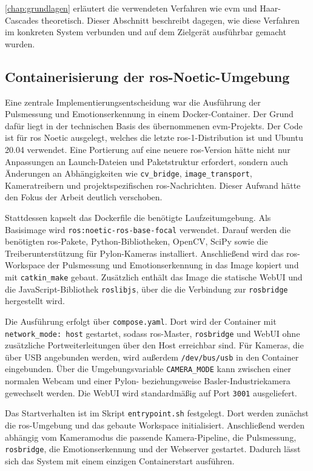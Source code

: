 \cref{chap:grundlagen} erläutert die verwendeten Verfahren wie \ac{evm} und Haar-Cascades theoretisch. Dieser Abschnitt beschreibt dagegen, wie diese Verfahren im konkreten System verbunden und auf dem Zielgerät ausführbar gemacht wurden.

\subsection{Containerisierung der \acs{ros}-Noetic-Umgebung}

Eine zentrale Implementierungsentscheidung war die Ausführung der Pulsmessung und Emotionserkennung in einem Docker-Container. Der Grund dafür liegt in der technischen Basis des übernommenen \ac{evm}-Projekts. Der Code ist für \ac{ros} Noetic ausgelegt, welches die letzte \ac{ros}-1-Distribution ist und Ubuntu 20.04 verwendet. Eine Portierung auf eine neuere \ac{ros}-Version hätte nicht nur Anpassungen an Launch-Dateien und Paketstruktur erfordert, sondern auch Änderungen an Abhängigkeiten wie \texttt{cv\_bridge}, \texttt{image\_transport}, Kameratreibern und projektspezifischen \ac{ros}-Nachrichten. Dieser Aufwand hätte den Fokus der Arbeit deutlich verschoben.

Stattdessen kapselt das Dockerfile die benötigte Laufzeitumgebung. Als Basisimage wird \texttt{ros:noetic-ros-base-}\allowbreak\texttt{focal} verwendet. Darauf werden die benötigten \ac{ros}-Pakete, \allowbreak Python-Bibliotheken, OpenCV, SciPy sowie die Treiberunterstützung für Pylon-Kameras installiert. Anschließend wird das \ac{ros}-Workspace der Pulsmessung und Emotionserkennung in das Image kopiert und mit \texttt{catkin\_make} gebaut. Zusätzlich enthält das Image die statische WebUI und die JavaScript-Bibliothek \texttt{roslibjs}, über die die Verbindung zur \texttt{rosbridge} hergestellt wird.

Die Ausführung erfolgt über \texttt{compose.yaml}. Dort wird der Container mit \texttt{network\_mode: host} gestartet, sodass \ac{ros}-Master, \texttt{rosbridge} und WebUI ohne zusätzliche Portweiterleitungen über den Host erreichbar sind. Für Kameras, die über USB angebunden werden, wird außerdem \texttt{/dev/bus/usb} in den Container eingebunden. Über die Umgebungsvariable \texttt{CAMERA\_MODE} kann zwischen einer normalen Webcam und einer Pylon- beziehungsweise Basler-Industriekamera gewechselt werden. Die WebUI wird standardmäßig auf Port \texttt{3001} ausgeliefert.

Das Startverhalten ist im Skript \texttt{entrypoint.sh} festgelegt. Dort werden zunächst die \ac{ros}-Umgebung und das gebaute Workspace initialisiert. Anschließend werden abhängig vom Kameramodus die passende Kamera-Pipeline, die Pulsmessung, \texttt{rosbridge}, die Emotionserkennung und der Webserver gestartet. Dadurch lässt sich das System mit einem einzigen Containerstart ausführen.

